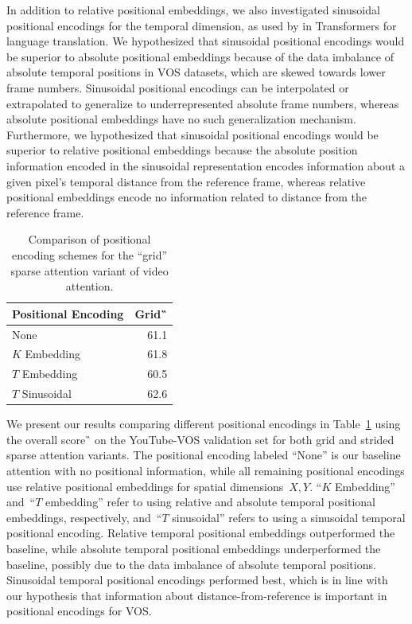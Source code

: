 In addition to relative positional embeddings, we also investigated sinusoidal
positional encodings for the temporal dimension, as used by
\citet{vaswani2017attention} in Transformers for language translation.
We hypothesized that sinusoidal positional encodings would be superior to
absolute positional embeddings because of the data imbalance of absolute
temporal positions in VOS datasets, which are skewed towards lower frame
numbers.
Sinusoidal positional encodings can be interpolated or extrapolated to
generalize to underrepresented absolute frame numbers, whereas absolute
positional embeddings have no such generalization mechanism.
Furthermore, we hypothesized that sinusoidal positional encodings would be
superior to relative positional embeddings because the absolute position
information encoded in the sinusoidal representation encodes information about
a given pixel's temporal distance from the reference frame, whereas relative
positional embeddings encode no information related to distance from the
reference frame.

\begin{table}
\caption{Comparison of positional encoding schemes for the ``grid'' sparse
         attention variant of video attention.}
\centering
\begin{tabular}{lr}
\toprule
Positional Encoding & Grid~\G{} \\
\midrule
None & \num{61.1}  \\
$K$ Embedding & \num{61.8} \\
$T$ Embedding & \num{60.5} \\
$T$ Sinusoidal & \num[math-rm=\mathbf]{62.6} \\
\bottomrule
\end{tabular}
\label{tab:pos-encoding}
\end{table}

We present our results comparing different positional encodings in
Table~\ref{tab:pos-encoding} using the overall score~\G{} on the YouTube-VOS
validation set for both grid and strided sparse attention variants.
The positional encoding labeled ``None'' is our baseline attention with no
positional information, while all remaining positional encodings use relative
positional embeddings for spatial dimensions~$X, Y$.
``$K$ Embedding'' and~``$T$ embedding'' refer to using relative and absolute
temporal positional embeddings, respectively, and~``$T$ sinusoidal'' refers to
using a sinusoidal temporal positional encoding.
Relative temporal positional embeddings outperformed the baseline, while
absolute temporal positional embeddings underperformed the baseline, possibly
due to the data imbalance of absolute temporal positions.
Sinusoidal temporal positional encodings performed best, which is in line with
our hypothesis that information about distance-from-reference is important in
positional encodings for VOS\@.


